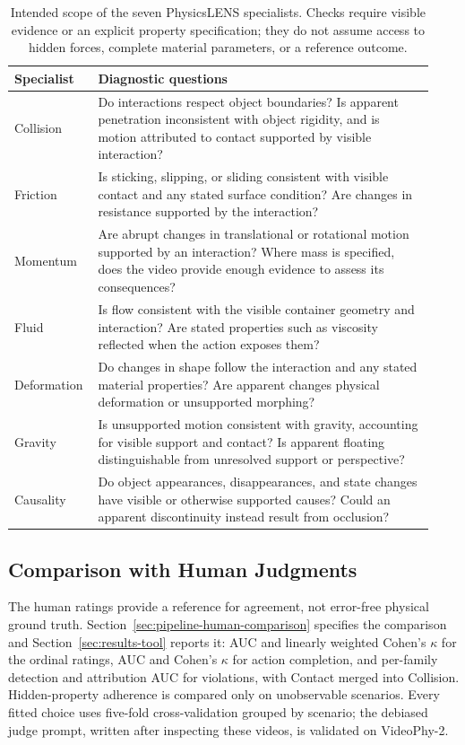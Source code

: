 \begin{table}[t]
    \centering
    \small
    \caption{Intended scope of the seven PhysicsLENS specialists. Checks require visible evidence or an explicit property specification; they do not assume access to hidden forces, complete material parameters, or a reference outcome.}
    \label{tab:specialists-scope}
    \begin{tabular}{@{}p{0.16\linewidth}p{0.77\linewidth}@{}}
        \toprule
        Specialist & Diagnostic questions \\
        \midrule
        Collision & Do interactions respect object boundaries? Is apparent penetration inconsistent with object rigidity, and is motion attributed to contact supported by visible interaction? \\
        Friction & Is sticking, slipping, or sliding consistent with visible contact and any stated surface condition? Are changes in resistance supported by the interaction? \\
        Momentum & Are abrupt changes in translational or rotational motion supported by an interaction? Where mass is specified, does the video provide enough evidence to assess its consequences? \\
        Fluid & Is flow consistent with the visible container geometry and interaction? Are stated properties such as viscosity reflected when the action exposes them? \\
        Deformation & Do changes in shape follow the interaction and any stated material properties? Are apparent changes physical deformation or unsupported morphing? \\
        Gravity & Is unsupported motion consistent with gravity, accounting for visible support and contact? Is apparent floating distinguishable from unresolved support or perspective? \\
        Causality & Do object appearances, disappearances, and state changes have visible or otherwise supported causes? Could an apparent discontinuity instead result from occlusion? \\
        \bottomrule
    \end{tabular}
\end{table}

\subsection{Comparison with Human Judgments}
\label{app:pipeline-human-comparison}
The human ratings provide a reference for agreement, not error-free physical ground truth. Section~\ref{sec:pipeline-human-comparison} specifies the comparison and Section~\ref{sec:results-tool} reports it: AUC and linearly weighted Cohen's $\kappa$ for the ordinal ratings, AUC and Cohen's $\kappa$ for action completion, and per-family detection and attribution AUC for violations, with Contact merged into Collision. Hidden-property adherence is compared only on unobservable scenarios. Every fitted choice uses five-fold cross-validation grouped by scenario; the debiased judge prompt, written after inspecting these videos, is validated on VideoPhy-2.

